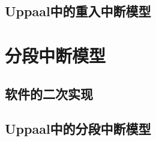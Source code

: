 \subsection{Uppaal中的重入中断模型}
\label{subsec:reentrant_uppaal}

\section{分段中断模型}
\label{sec:segment}

\subsection{软件的二次实现}
\label{subsec:segment_software}

\subsection{Uppaal中的分段中断模型}
\label{subsec:segment_uppaal}